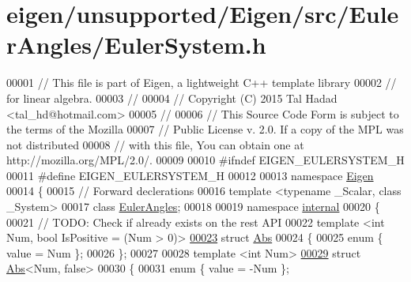 \hypertarget{eigen_2unsupported_2_eigen_2src_2_euler_angles_2_euler_system_8h_source}{}\section{eigen/unsupported/\+Eigen/src/\+Euler\+Angles/\+Euler\+System.h}
\label{eigen_2unsupported_2_eigen_2src_2_euler_angles_2_euler_system_8h_source}

\begin{DoxyCode}
00001 \textcolor{comment}{// This file is part of Eigen, a lightweight C++ template library}
00002 \textcolor{comment}{// for linear algebra.}
00003 \textcolor{comment}{//}
00004 \textcolor{comment}{// Copyright (C) 2015 Tal Hadad <tal\_hd@hotmail.com>}
00005 \textcolor{comment}{//}
00006 \textcolor{comment}{// This Source Code Form is subject to the terms of the Mozilla}
00007 \textcolor{comment}{// Public License v. 2.0. If a copy of the MPL was not distributed}
00008 \textcolor{comment}{// with this file, You can obtain one at http://mozilla.org/MPL/2.0/.}
00009 
00010 \textcolor{preprocessor}{#ifndef EIGEN\_EULERSYSTEM\_H}
00011 \textcolor{preprocessor}{#define EIGEN\_EULERSYSTEM\_H}
00012 
00013 \textcolor{keyword}{namespace }\hyperlink{namespace_eigen}{Eigen}
00014 \{
00015   \textcolor{comment}{// Forward declerations}
00016   \textcolor{keyword}{template} <\textcolor{keyword}{typename} \_Scalar, \textcolor{keyword}{class} \_System>
00017   \textcolor{keyword}{class }\hyperlink{class_euler_angles}{EulerAngles};
00018   
00019   \textcolor{keyword}{namespace }\hyperlink{namespaceinternal}{internal}
00020   \{
00021     \textcolor{comment}{// TODO: Check if already exists on the rest API}
00022     \textcolor{keyword}{template} <\textcolor{keywordtype}{int} Num, \textcolor{keywordtype}{bool} IsPositive = (Num > 0)>
\hyperlink{struct_eigen_1_1internal_1_1_abs}{00023}     \textcolor{keyword}{struct} \hyperlink{struct_eigen_1_1internal_1_1_abs}{Abs}
00024     \{
00025       \textcolor{keyword}{enum} \{ value = Num \};
00026     \};
00027   
00028     \textcolor{keyword}{template} <\textcolor{keywordtype}{int} Num>
\hyperlink{struct_eigen_1_1internal_1_1_abs_3_01_num_00_01false_01_4}{00029}     \textcolor{keyword}{struct }\hyperlink{struct_eigen_1_1internal_1_1_abs}{Abs}<Num, false>
00030     \{
00031       \textcolor{keyword}{enum} \{ value = -Num \};

\end{DoxyCode}
